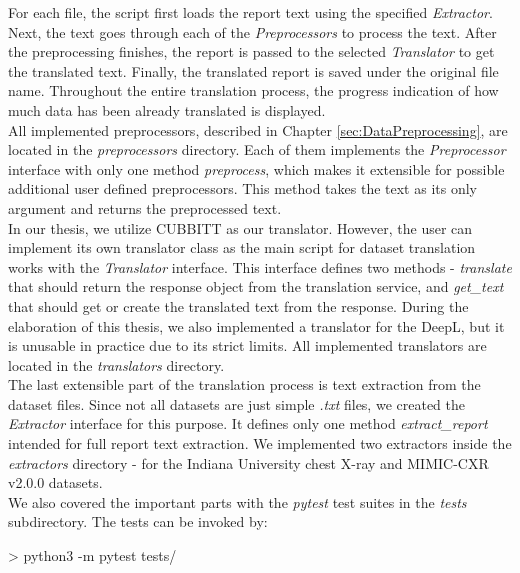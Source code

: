 For each file, the script first loads the report text using the specified \textit{Extractor}. Next, the text goes through each of the \textit{Preprocessors} to process the text. After the preprocessing finishes, the report is passed to the selected \textit{Translator} to get the translated text. Finally, the translated report is saved under the original file name. Throughout the entire translation process, the progress indication of how much data has been already translated is displayed.\\

All implemented preprocessors, described in Chapter \ref{sec:DataPreprocessing}, are located in the \textit{preprocessors} directory. Each of them implements the  \textit{Preprocessor} interface with only one method \textit{preprocess}, which makes it extensible for possible additional user defined preprocessors. This method takes the text as its only argument and returns the preprocessed text.\\

In our thesis, we utilize CUBBITT as our translator. However, the user can implement its own translator class as the main script for dataset translation works with the \textit{Translator} interface. This interface defines two methods - \textit{translate} that should return the response object from the translation service, and \textit{get\_text} that should get or create the translated text from the response. During the elaboration of this thesis, we also implemented a translator for the DeepL, but it is unusable in practice due to its strict limits. All implemented translators are located in the \textit{translators} directory.\\

The last extensible part of the translation process is text extraction from the dataset files. Since not all datasets are just simple \textit{.txt} files, we created the \textit{Extractor} interface for this purpose. It defines only one method \textit{extract\_report} intended for full report text extraction. We implemented two extractors inside the \textit{extractors} directory - for the Indiana University chest X-ray and MIMIC-CXR v2.0.0 datasets.\\

We also covered the important parts with the \textit{pytest} test suites in the \textit{tests} subdirectory. The tests can be invoked by:
\begin{code}
> python3 -m pytest tests/
\end{code}

